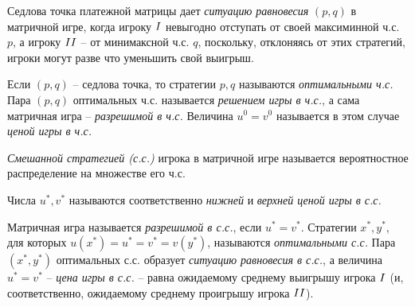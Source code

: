 \begin{definition}
	Седлова точка платежной матрицы дает \emph{ситуацию равновесия} $(p,q)$ в матричной игре, когда игроку $\RomanNumeralCaps{1}$ невыгодно отступать от своей максиминной ч.с. $p$, а игроку $\RomanNumeralCaps{2}$ -- от минимаксной ч.с. $q$, поскольку, отклоняясь от этих стратегий, игроки могут разве что уменьшить свой выигрыш.

	Если $(p,q)$ -- седлова точка, то стратегии $p,q$ называются \emph{оптимальными ч.с.} Пара $(p,q)$ оптимальных ч.с. называется \emph{решением игры в ч.с.}, а сама матричная игра -- \emph{разрешимой в ч.с.} Величина $u^0 = v^0$ называется в этом случае \emph{ценой игры в ч.с.}
\end{definition}

\begin{definition}
	\emph{Смешанной стратегией (с.с.)} игрока в матричной игре называется вероятностное распределение на множестве его ч.с.
\end{definition}

\begin{definition}
	Числа $u^*, v^*$ называются соответственно \emph{нижней} и \emph{верхней ценой игры в с.с.}

	Матричная игра называется \emph{разрешимой в с.с.}, если $u^* = v^*$. Стратегии $x^*,y^*$, для которых $u(x^*) = u^* = v^* = v(y^*)$, называются \emph{оптимальными с.с.} Пара $(x^*,y^*)$ оптимальных с.с. образует \emph{ситуацию равновесия в с.с.}, а величина $u^* = v^*$ -- \emph{цена игры в с.с.} -- равна ожидаемому среднему выигрышу игрока $\RomanNumeralCaps{1}$ (и, соответственно, ожидаемому среднему проигрышу игрока $\RomanNumeralCaps{2}$).
\end{definition}
